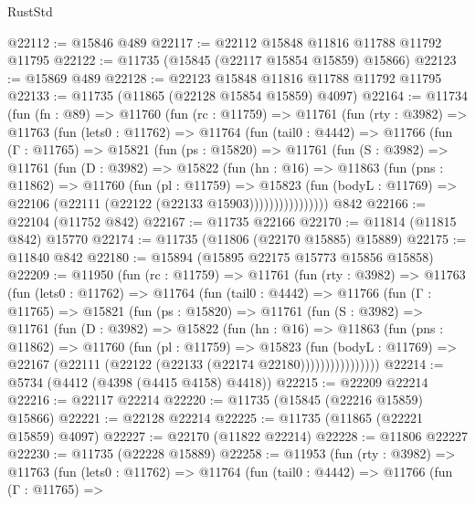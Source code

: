 \begin{lexlean}{RustStd}
\begin{coremodule}
@22112 := @15846 @489
@22117 := @22112 @15848 @11816 @11788 @11792 @11795
@22122 := @11735 (@15845 (@22117 @15854 @15859) @15866)
@22123 := @15869 @489
@22128 := @22123 @15848 @11816 @11788 @11792 @11795
@22133 := @11735 (@11865 (@22128 @15854 @15859) @4097)
@22164 := @11734
    (fun (fn : @89) =>
    @11760
      (fun (rc : @11759) =>
      @11761
        (fun (rty : @3982) =>
        @11763
          (fun (lets0 : @11762) =>
          @11764
            (fun (tail0 : @4442) =>
            @11766
              (fun (Γ : @11765) =>
              @15821
                (fun (ps : @15820) =>
                @11761
                  (fun (S : @3982) =>
                  @11761
                    (fun (D : @3982) =>
                    @15822
                      (fun (hn : @16) =>
                      @11863
                        (fun (pns : @11862) =>
                        @11760
                          (fun (pl : @11759) =>
                          @15823
                            (fun (bodyL : @11769) =>
                            @22106 (@22111 (@22122 (@22133 @15903))))))))))))))))
    @842
@22166 := @22104 (@11752 @842)
@22167 := @11735 @22166
@22170 := @11814 (@11815 @842) @15770
@22174 := @11735 (@11806 (@22170 @15885) @15889)
@22175 := @11840 @842
@22180 := @15894 (@15895 @22175 @15773 @15856 @15858)
@22209 := @11950
    (fun (rc : @11759) =>
    @11761
      (fun (rty : @3982) =>
      @11763
        (fun (lets0 : @11762) =>
        @11764
          (fun (tail0 : @4442) =>
          @11766
            (fun (Γ : @11765) =>
            @15821
              (fun (ps : @15820) =>
              @11761
                (fun (S : @3982) =>
                @11761
                  (fun (D : @3982) =>
                  @15822
                    (fun (hn : @16) =>
                    @11863
                      (fun (pns : @11862) =>
                      @11760
                        (fun (pl : @11759) =>
                        @15823
                          (fun (bodyL : @11769) =>
                          @22167 (@22111 (@22122 (@22133 (@22174 @22180))))))))))))))))
@22214 := @5734 (@4412 (@4398 (@4415 @4158) @4418))
@22215 := @22209 @22214
@22216 := @22117 @22214
@22220 := @11735 (@15845 (@22216 @15859) @15866)
@22221 := @22128 @22214
@22225 := @11735 (@11865 (@22221 @15859) @4097)
@22227 := @22170 (@11822 @22214)
@22228 := @11806 @22227
@22230 := @11735 (@22228 @15889)
@22258 := @11953
    (fun (rty : @3982) =>
    @11763
      (fun (lets0 : @11762) =>
      @11764
        (fun (tail0 : @4442) =>
        @11766
          (fun (Γ : @11765) =>

\end{coremodule}
\end{lexlean}
